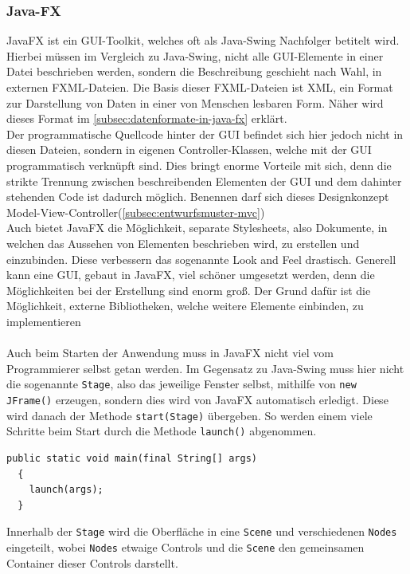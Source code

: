 \subsubsection{Java-FX}\label{sssec: JavaFX}
JavaFX ist ein GUI-Toolkit, welches oft als Java-Swing Nachfolger betitelt wird.
Hierbei müssen im Vergleich zu Java-Swing, nicht alle GUI-Elemente in einer Datei beschrieben werden, sondern die Beschreibung geschieht nach Wahl, in externen FXML-Dateien.
Die Basis dieser FXML-Dateien ist XML, ein Format zur Darstellung von Daten in einer von Menschen lesbaren Form.
Näher wird dieses Format im \autoref{subsec:datenformate-in-java-fx} erklärt.\\
Der programmatische Quellcode hinter der GUI befindet sich hier jedoch nicht in diesen Dateien, sondern in eigenen Controller-Klassen, welche mit der GUI programmatisch verknüpft sind.
Dies bringt enorme Vorteile mit sich, denn die strikte Trennung zwischen beschreibenden Elementen der GUI und dem dahinter stehenden Code ist dadurch möglich.
Benennen darf sich dieses Designkonzept Model-View-Controller(\autoref{subsec:entwurfsmuster-mvc})\\
Auch bietet JavaFX die Möglichkeit, separate Stylesheets, also Dokumente, in welchen das Aussehen von Elementen beschrieben wird, zu erstellen und einzubinden.
Diese verbessern das sogenannte Look and Feel drastisch.
Generell kann eine GUI, gebaut in JavaFX, viel schöner umgesetzt werden, denn die Möglichkeiten bei der Erstellung sind enorm groß.
Der Grund dafür ist die Möglichkeit, externe Bibliotheken, welche weitere Elemente einbinden, zu implementieren\\\\
Auch beim Starten der Anwendung muss in JavaFX nicht viel vom Programmierer selbst getan werden.
Im Gegensatz zu Java-Swing muss hier nicht die sogenannte \lstinline[style=java]{Stage}, also das jeweilige Fenster selbst, mithilfe von \lstinline[style=java]{new JFrame()} erzeugen, sondern dies wird von JavaFX automatisch erledigt.
Diese wird danach der Methode \lstinline[style=java]{start(Stage)} übergeben.
So werden einem viele Schritte beim Start durch die Methode \lstinline[style=java]{launch()} abgenommen.
\begin{lstlisting}[style=java,caption=JavaFX Startvorgang,label=javafxStart]
  public static void main(final String[] args)
  {
    launch(args);
  }
\end{lstlisting}
\newpage
Innerhalb der \lstinline[style=java]{Stage} wird die Oberfläche in eine \lstinline[style=java]{Scene} und verschiedenen \lstinline[style=java]{Nodes} eingeteilt, wobei \lstinline[style=java]{Nodes} etwaige Controls und die \lstinline[style=java]{Scene} den gemeinsamen Container dieser Controls darstellt.

